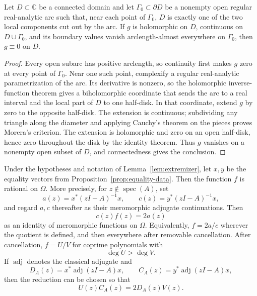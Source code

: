 \documentclass[preprints,article,submit,oneauthor]{Definitions/mdpi}
\numberwithin{equation}{section}
\newcommand{\C}{\mathbb C}
\newcommand{\spec}{\operatorname{spec}}
\newcommand{\adj}{\operatorname{adj}}
\begin{document}
\begin{Lemma}\label{lem:boundary-uniqueness}
Let \(D\subset\C\) be a connected domain and let \(\Gamma_0\subset\partial D\)
be a nonempty open regular real-analytic arc such that, near each point of
\(\Gamma_0\), \(D\) is exactly one of the two local components cut out by the
arc.  If \(g\) is holomorphic
on \(D\), continuous on \(D\cup\Gamma_0\), and its boundary values vanish
arclength-almost everywhere on \(\Gamma_0\), then \(g\equiv0\) on \(D\).
\end{Lemma}

\begin{proof}
Every open subarc has positive arclength, so continuity first makes \(g\) zero
at every point of \(\Gamma_0\).  Near one such point, complexify a regular
real-analytic parametrization of the arc.  Its derivative is nonzero, so the
holomorphic inverse-function theorem gives a biholomorphic coordinate that
sends the arc to a real interval and the local part of \(D\) to one
half-disk.  In that coordinate, extend \(g\) by zero to the opposite
half-disk.  The extension is continuous; subdividing any triangle along the
diameter and applying Cauchy's theorem on the pieces proves Morera's
criterion.  The extension is holomorphic and zero on an open half-disk, hence
zero throughout the disk by the identity theorem.  Thus \(g\) vanishes on a
nonempty open subset of \(D\), and connectedness gives the conclusion.
\end{proof}

\begin{Proposition}\label{prop:rational}
Under the hypotheses and notation of Lemma~\ref{lem:extremizer}, let \(x,y\)
be the equality vectors from Proposition~\ref{prop:equality-data}.  Then the
function \(f\) is rational on \(\Omega\).  More precisely, for
\(z\notin\spec(A)\), set
\[
 a(z)=x^*(zI-A)^{-1}x,\qquad c(z)=y^*(zI-A)^{-1}x,
\]
and regard \(a,c\) thereafter as their meromorphic adjugate continuations.
Then
\[
 c(z)f(z)=2a(z)                                       \tag{5.2}
\]
as an identity of meromorphic functions on \(\Omega\).  Equivalently,
\(f=2a/c\) wherever the quotient is defined, and then everywhere after
removable cancellation.
After cancellation, \(f=U/V\) for coprime polynomials with
\[
 \deg U>\deg V.                                       \tag{5.3}
\]
If \(\adj\) denotes the classical adjugate and
\[
 D_A(z)=x^*\adj(zI-A)x,\qquad C_A(z)=y^*\adj(zI-A)x,
\]
then the reduction can be chosen so that
\[
 U(z)C_A(z)=2D_A(z)V(z).
\]
\end{Proposition}
\end{document}
